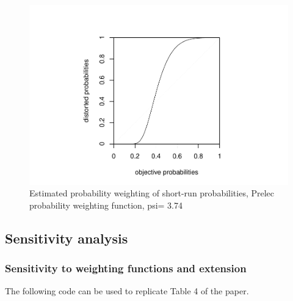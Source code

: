 \documentclass[
]{article}
\begin{document}
\begin{figure}
\centering
\includegraphics{replication_instructions_files/figure-latex/unnamed-chunk-16-1.pdf}
\caption{Estimated probability weighting of short-run probabilities,
Prelec probability weighting function, psi= 3.74}
\end{figure}

\hypertarget{sensitivity-analysis}{%
\subsection{Sensitivity analysis}\label{sensitivity-analysis}}

\hypertarget{sensitivity-to-weighting-functions-and-extension}{%
\subsubsection{Sensitivity to weighting functions and
extension}\label{sensitivity-to-weighting-functions-and-extension}}

The following code can be used to replicate Table 4 of the paper.
\end{document}
